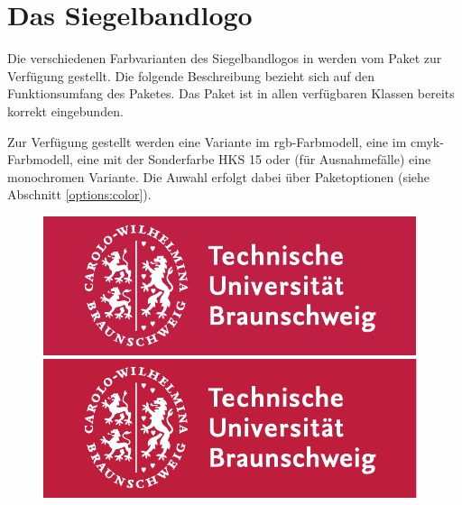\chapter{Das Siegelbandlogo}

Die verschiedenen Farbvarianten des Siegelbandlogos in \tubslatex werden
vom Paket  zur Verfügung gestellt.
Die folgende Beschreibung bezieht sich auf den Funktionsumfang des Paketes.
Das Paket ist in allen verfügbaren Klassen bereits korrekt eingebunden.

Zur Verfügung gestellt werden eine Variante im rgb-Farbmodell, eine im
cmyk-Farbmodell, eine mit der Sonderfarbe HKS 15 oder (für Ausnahmefälle)
eine monochromen Variante.
Die Auwahl erfolgt dabei über Paketoptionen
(siehe Abschnitt \ref{options:color}).

\begin{figure}[!ht]
\begin{minipage}{0.5\textwidth}
  \centering
  \includegraphics[width=\tubslogoBaseWidth]{TUBraunschweig_RGB}
\end{minipage}
\begin{minipage}{0.5\textwidth}
  \centering
  \includegraphics[width=\tubslogoBaseWidth]{TUBraunschweig_RGB_beamer}
\end{minipage}


\end{figure}
